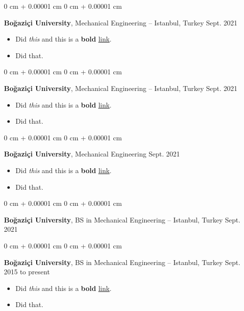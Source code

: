 \documentclass[10pt, letterpaper]{article}
\newenvironment{highlights}{
    \begin{itemize}[
        topsep=0.10 cm,
        parsep=0.10 cm,
        partopsep=0pt,
        itemsep=0pt,
        leftmargin=0 cm + 10pt
    ]
}{
    \end{itemize}
        
    \vspace{-0.20cm}
} %
\newenvironment{onecolentry}{
    \begin{adjustwidth}{
        0 cm + 0.00001 cm
    }{
        0 cm + 0.00001 cm
    }
}{
    \end{adjustwidth}
} %
\begin{document}
        \begin{onecolentry}
            \textbf{Boğaziçi University}, Mechanical Engineering -- Istanbul, Turkey \hfill Sept. 2021
            \begin{highlights}
                \item Did \textit{this} and this is a \textbf{bold} \href{https://example.com}{link}.
                \item Did that.
            \end{highlights}
        \end{onecolentry}

        \vspace{0.1 cm}

        \begin{onecolentry}
            \textbf{Boğaziçi University}, Mechanical Engineering -- Istanbul, Turkey \hfill Sept. 2021
            \begin{highlights}
                \item Did \textit{this} and this is a \textbf{bold} \href{https://example.com}{link}.
                \item Did that.
            \end{highlights}
        \end{onecolentry}

        \vspace{0.1 cm}

        \begin{onecolentry}
            \textbf{Boğaziçi University}, Mechanical Engineering \hfill Sept. 2021
            \begin{highlights}
                \item Did \textit{this} and this is a \textbf{bold} \href{https://example.com}{link}.
                \item Did that.
            \end{highlights}
        \end{onecolentry}

        \vspace{0.1 cm}

        \begin{onecolentry}
            \textbf{Boğaziçi University}, BS in Mechanical Engineering -- Istanbul, Turkey \hfill Sept. 2021
        \end{onecolentry}

        \vspace{0.1 cm}

        \begin{onecolentry}
            \textbf{Boğaziçi University}, BS in Mechanical Engineering -- Istanbul, Turkey \hfill Sept. 2015 to present
            \begin{highlights}
                \item Did \textit{this} and this is a \textbf{bold} \href{https://example.com}{link}.
                \item Did that.
            \end{highlights}
        \end{onecolentry}
\end{document}
